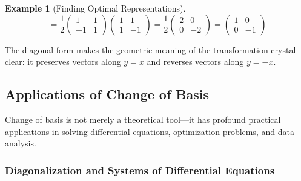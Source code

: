 \documentclass[12pt]{article}
\numberwithin{equation}{section}
\theoremstyle{plain}
\theoremstyle{definition}
\newtheorem{example}[theorem]{Example}
\theoremstyle{remark}
\begin{document}
\begin{example}[Finding Optimal Representations]
$$= \frac{1}{2}\begin{pmatrix} 1 & 1 \\ -1 & 1 \end{pmatrix}\begin{pmatrix} 1 & 1 \\ 1 & -1 \end{pmatrix} = \frac{1}{2}\begin{pmatrix} 2 & 0 \\ 0 & -2 \end{pmatrix} = \begin{pmatrix} 1 & 0 \\ 0 & -1 \end{pmatrix}$$ \checkmark

The diagonal form makes the geometric meaning of the transformation crystal clear: it preserves vectors along $y = x$ and reverses vectors along $y = -x$.
\end{example}

\subsection{Applications of Change of Basis}

Change of basis is not merely a theoretical tool—it has profound practical applications in solving differential equations, optimization problems, and data analysis.

\subsubsection{Diagonalization and Systems of Differential Equations}
\end{document}
